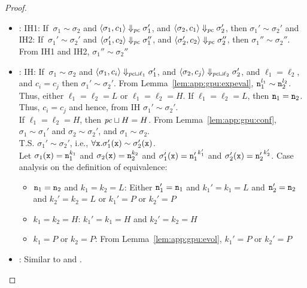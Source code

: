 \begin{proof}
\begin{itemize}
    \item {}: IH1: If $~\sigma_1 \sim \sigma_2$ and $\langle
      \sigma_1, c_1 \rangle
      \Downarrow_{\mathit{pc}} \sigma_1' $, and $\langle \sigma_2, c_1
      \rangle\Downarrow_{\mathit{pc}} \sigma_2' $, then $\sigma_1' \sim
      \sigma_2'$ and \\
      IH2: If $~\sigma_1' \sim \sigma_2'$ and $\langle \sigma_1', c_2 \rangle
      \Downarrow_{\mathit{pc}} \sigma_1'' $, and $\langle \sigma_2', c_2
      \rangle\Downarrow_{\mathit{pc}} \sigma_2'' $, then $\sigma_1'' \sim
      \sigma_2''$. \\
      From IH1 and IH2, $\sigma_1'' \sim \sigma_2''$
    \item {}: IH: If $~\sigma_1 \sim \sigma_2$ and $\langle
      \sigma_1, c_i \rangle
      \Downarrow_{\mathit{pc} \sqcup \ell_1} \sigma_1' $, and $\langle 
      \sigma_2, c_j
      \rangle\Downarrow_{\mathit{pc} \sqcup \ell_2} \sigma_2' $, and $\ell_1 =
      \ell_2$, and $c_i = c_j$ then $\sigma_1' \sim
      \sigma_2'$. From Lemma~\ref{lem:app:gpu:expeval}, $\texttt{n}_1^{l_1} \sim
      \texttt{n}_2^{l_2}$. Thus, either $\ell_1 = \ell_2 = L$ or $\ell_1
      =\ell_2 = H$. If $\ell_1 = \ell_2 = L$, then $\texttt{n}_1 = \texttt{n}_2$. Thus,
       $c_i = c_j$ and hence, from IH $\sigma_1' \sim \sigma_2'$.\\
       If $\ell_1 = \ell_2 = H$, then $\mathit{pc} \sqcup H = H$. From
       Lemma~\ref{lem:app:gpu:conf}, $\sigma_1 \sim \sigma_1'$ and $\sigma_2
       \sim \sigma_2'$, and $\sigma_1 \sim \sigma_2$. \\
       T.S. $\sigma_1' \sim \sigma_2'$, i.e., $\forall \texttt{x}. \sigma_1'(\texttt{x})
       \sim \sigma_2'(\texttt{x})$. \\
       Let $\sigma_1(\texttt{x}) = \texttt{n}_1^{k_1}$ and $\sigma_2(\texttt{x}) = \texttt{n}_2^{k_2}$ and
       $\sigma_1'(\texttt{x}) = {\texttt{n}_1'}^{k_1'}$ and $\sigma_2'(\texttt{x}) = {\texttt{n}_2'}^{k_2'}$.
       Case analysis on the definition of equivalence:
       \begin{itemize}
         \item $\texttt{n}_1 = \texttt{n}_2$ and $k_1 = k_2 = L$: Either $\texttt{n}_1' = \texttt{n}_1$
           and $k_1' = k_1 = L$ and $\texttt{n}_2' = \texttt{n}_2$
           and $k_2' = k_2 = L$  or $k_1' = P$ or $k_2' = P$
         \item $k_1 = k_2 = H$: $k_1' = k_1 = H$ and $k_2' = k_2 = H$
         \item $k_1 = P$ or $k_2 = P$: From Lemma~\ref{lem:app:gpu:evol},
           $k_1' = P$ or $k_2' = P$
       \end{itemize}
       
    \item {}: Similar to  and .
  \end{itemize}
\end{proof}

